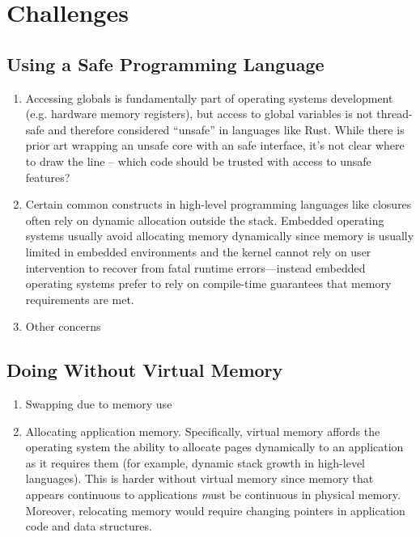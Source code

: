 \section{Challenges}

\subsection{Using a Safe Programming Language}

\begin{enumerate}
  \item Accessing globals is fundamentally part of operating systems development
    (e.g. hardware memory registers), but access to global variables is not
    thread-safe and therefore considered ``unsafe'' in languages like Rust.
    While there is prior art wrapping an unsafe core with an safe interface,
    it's not clear where to draw the line -- which code should be trusted with
    access to unsafe features?

  \item Certain common constructs in high-level programming languages like
    closures often rely on dynamic allocation outside the stack. Embedded
    operating systems usually avoid allocating memory dynamically since memory
    is usually limited in embedded environments and the kernel cannot rely on
    user intervention to recover from fatal runtime errors---instead embedded
    operating systems prefer to rely on compile-time guarantees that memory
    requirements are met.

  \item Other concerns
\end{enumerate}

\subsection{Doing Without Virtual Memory}

\begin{enumerate}
  \item Swapping due to memory use
  \item Allocating application memory. Specifically, virtual memory affords the
    operating system the ability to allocate pages dynamically to an application
    as it requires them (for example, dynamic stack growth in high-level
    languages). This is harder without virtual memory since memory that appears
    continuous to applications {\emph must} be continuous in physical memory.
    Moreover, relocating memory would require changing pointers in application
    code and data structures.
\end{enumerate}

